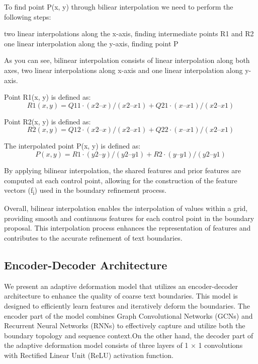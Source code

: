 To find point P(x, y) through biliear interpolation we need to perform the following steps:

    two linear interpolations along the x-axis, finding intermediate points R1 and R2
    one linear interpolation along the y-axis, finding point P

As you can see, bilinear interpolation consists of linear interpolation along both axes, two linear interpolations along x-axis and one linear interpolation along y-axis.

Point R1(x, y) is defined as:
\begin{equation}
  R1(x, y) = Q11 · (x2 – x) / (x2 – x1) + Q21 · (x – x1) / (x2 – x1)
\end{equation}

Point R2(x, y) is defined as:
\begin{equation}
R2(x, y) = Q12 · (x2 – x) / (x2 – x1) + Q22 · (x – x1) / (x2 – x1)
\end{equation}

The interpolated point P(x, y) is defined as:
\begin{equation}
P(x, y) = R1 · (y2 – y) / (y2 – y1) + R2 · (y – y1) / (y2 – y1) 
\end{equation}

By applying bilinear interpolation, the shared features and prior features are computed at each control point, allowing for the construction of the feature vectors (f\textsubscript{i}) used in the boundary refinement process.

Overall, bilinear interpolation enables the interpolation of values within a grid, providing smooth and continuous features for each control point in the boundary proposal. This interpolation process enhances the representation of features and contributes to the accurate refinement of text boundaries.

\subsection{Encoder-Decoder Architecture}
 We present an adaptive deformation model that utilizes an encoder-decoder architecture to enhance the quality of coarse text boundaries. This model is designed to efficiently learn features and iteratively deform the boundaries. The encoder part of the model combines Graph Convolutional Networks (GCNs) and Recurrent Neural Networks (RNNs) to effectively capture and utilize both the boundary topology and sequence context.On the other hand, the decoder part of the adaptive deformation model consists of three layers of 1 × 1 convolutions with Rectified Linear Unit (ReLU) activation function.

